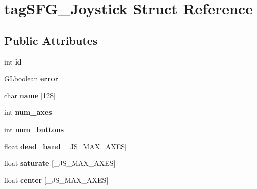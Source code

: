 \hypertarget{structtag_s_f_g___joystick}{}\section{tag\+S\+F\+G\+\_\+\+Joystick Struct Reference}
\label{structtag_s_f_g___joystick}
\subsection*{Public Attributes}
\begin{DoxyCompactItemize}
\item 
int {\bfseries id}\hypertarget{structtag_s_f_g___joystick_aaaafba296ef40f35bbf98dbb99d2ec2f}{}\label{structtag_s_f_g___joystick_aaaafba296ef40f35bbf98dbb99d2ec2f}

\item 
G\+Lboolean {\bfseries error}\hypertarget{structtag_s_f_g___joystick_a04c3a66babbaaab3e7f5333ed407ea0d}{}\label{structtag_s_f_g___joystick_a04c3a66babbaaab3e7f5333ed407ea0d}

\item 
char {\bfseries name} \mbox{[}128\mbox{]}\hypertarget{structtag_s_f_g___joystick_a0c5b6dcabec9ab290725ce6f505b57ac}{}\label{structtag_s_f_g___joystick_a0c5b6dcabec9ab290725ce6f505b57ac}

\item 
int {\bfseries num\+\_\+axes}\hypertarget{structtag_s_f_g___joystick_ac073c535ea9c3557994394f1f97f5b88}{}\label{structtag_s_f_g___joystick_ac073c535ea9c3557994394f1f97f5b88}

\item 
int {\bfseries num\+\_\+buttons}\hypertarget{structtag_s_f_g___joystick_aa7cb7489d16de9ca7c7691ab911e598e}{}\label{structtag_s_f_g___joystick_aa7cb7489d16de9ca7c7691ab911e598e}

\item 
float {\bfseries dead\+\_\+band} \mbox{[}\+\_\+\+J\+S\+\_\+\+M\+A\+X\+\_\+\+A\+X\+ES\mbox{]}\hypertarget{structtag_s_f_g___joystick_a0a6727e9a494a6cb49c62f73cfba47fd}{}\label{structtag_s_f_g___joystick_a0a6727e9a494a6cb49c62f73cfba47fd}

\item 
float {\bfseries saturate} \mbox{[}\+\_\+\+J\+S\+\_\+\+M\+A\+X\+\_\+\+A\+X\+ES\mbox{]}\hypertarget{structtag_s_f_g___joystick_af7f4c3be1c80fcb36bb348a0db4a2eb1}{}\label{structtag_s_f_g___joystick_af7f4c3be1c80fcb36bb348a0db4a2eb1}

\item 
float {\bfseries center} \mbox{[}\+\_\+\+J\+S\+\_\+\+M\+A\+X\+\_\+\+A\+X\+ES\mbox{]}\hypertarget{structtag_s_f_g___joystick_a6b0e23bf73d56eca07d6017c51e75bf9}{}\label{structtag_s_f_g___joystick_a6b0e23bf73d56eca07d6017c51e75bf9}


\end{DoxyCompactItemize}
